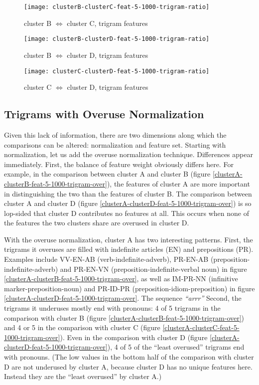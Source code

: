 \begin{figure}
  \texttt{[image: clusterB-clusterC-feat-5-1000-trigram-ratio]}
  \caption{cluster B $\Leftrightarrow$ cluster C, trigram features}
\end{figure}
\begin{figure}
  \texttt{[image: clusterB-clusterD-feat-5-1000-trigram-ratio]}
  \caption{cluster B $\Leftrightarrow$ cluster D, trigram features}
\end{figure}
\begin{figure}
  \texttt{[image: clusterC-clusterD-feat-5-1000-trigram-ratio]}
  \caption{cluster C $\Leftrightarrow$ cluster D, trigram features}
\end{figure}

\subsection{Trigrams with Overuse Normalization}
\label{feature-ranking-overuse}

Given this lack of information, there are two dimensions along which
the comparisons can be altered: normalization and feature
set. Starting with normalization, let us add the overuse normalization
technique. Differences appear immediately. First, the balance of
feature weight obviously differs here. For example, in the comparison
between cluster A and cluster B (figure
\ref{clusterA-clusterB-feat-5-1000-trigram-over}), the features of
cluster A are more important in distinguishing the two than the
features of cluster B. The comparison between cluster A and cluster D (figure
\ref{clusterA-clusterD-feat-5-1000-trigram-over})
is so lop-sided that cluster D contributes no features at all. This
occurs when none of the features the two clusters share are overused
in cluster D.

With the overuse normalization, cluster A has two interesting
patterns. First, the trigrams it overuses are filled with indefinite
articles (EN) and prepositions (PR). Examples include VV-EN-AB
(verb-indefinite-adverb), PR-EN-AB (preposition-indefinite-adverb) and
PR-EN-VN (preposition-indefinite-verbal noun) in figure
\ref{clusterA-clusterB-feat-5-1000-trigram-over}, as well as IM-PR-NN
(infinitive marker-preposition-noun) and PR-ID-PR
(preposition-idiom-preposition) in figure
\ref{clusterA-clusterD-feat-5-1000-trigram-over}. 
The sequence  \textit{``arrr''}
Second, the trigrams
it underuses mostly end with pronouns: 4 of 5 trigrams in the
comparison with cluster B (figure
\ref{clusterA-clusterB-feat-5-1000-trigram-over}) and 4 or 5 in the
comparison with cluster C (figure
\ref{clusterA-clusterC-feat-5-1000-trigram-over}). Even in the
comparison with cluster D (figure
\ref{clusterA-clusterD-feat-5-1000-trigram-over}), 4 of 5 of the
``least overused'' trigrams end with pronouns. (The low values in the
bottom half of the comparison with cluster D are not underused by
cluster A, because cluster D has no unique features here. Instead they
are the ``least overused'' by cluster A.)

